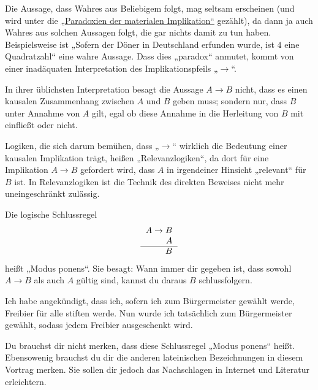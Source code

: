 \begin{bem} \label{keinekausalitaet}
    Die Aussage, dass Wahres aus Beliebigem folgt, mag seltsam erscheinen (und wird unter die \href{https://de.wikipedia.org/wiki/Paradoxien_der_materialen_Implikation}{„Paradoxien der materialen Implikation“} gezählt), da dann ja auch Wahres aus solchen Aussagen folgt, die gar nichts damit zu tun haben. Beispielsweise ist „Sofern der Döner in Deutschland erfunden wurde, ist $4$ eine Quadratzahl“ eine wahre Aussage. Dass dies „paradox“ anmutet, kommt von einer inadäquaten Interpretation des Implikationspfeils „$\to$“.
    
    In ihrer üblichsten Interpretation besagt die Aussage $A\to B$ nicht, dass es einen kausalen Zusammenhang zwischen $A$ und $B$ geben muss; sondern nur, dass $B$ unter Annahme von $A$ gilt, egal ob diese Annahme in die Herleitung von $B$ mit einfließt oder nicht.

    Logiken, die sich darum bemühen, dass „$\to$“ wirklich die Bedeutung einer kausalen Implikation trägt, heißen „Relevanzlogiken“, da dort für eine Implikation $A\to B$ gefordert wird, dass $A$ in irgendeiner Hinsicht „relevant“ für $B$ ist. In Relevanzlogiken ist die Technik des direkten Beweises nicht mehr uneingeschränkt zulässig.
\end{bem}


\begin{axiom} \label{modusponens} 
    Die logische Schlussregel
    \[\begin{tabular}{r}
        $A\to B$ \\
        $A$ \\
        \hline
        $B$
   \end{tabular}\]
    heißt „Modus ponens“. Sie besagt: Wann immer dir gegeben ist, dass sowohl $A\to B$ als auch $A$ gültig sind, kannst du daraus $B$ schlussfolgern.
\end{axiom}


\begin{bsp}
    Ich habe angekündigt, dass ich, sofern ich zum Bürgermeister gewählt werde, Freibier für alle stiften werde. Nun wurde ich tatsächlich zum Bürgermeister gewählt, sodass jedem Freibier ausgeschenkt wird.
\end{bsp}


\begin{bem}
    Du brauchst dir nicht merken, dass diese Schlussregel „Modus ponens“ heißt. Ebensowenig brauchst du dir die anderen lateinischen Bezeichnungen in diesem Vortrag merken. Sie sollen dir jedoch das Nachschlagen in Internet und Literatur erleichtern.
\end{bem}


